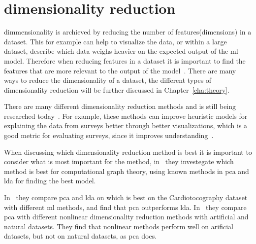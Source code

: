 
\section{dimensionality reduction}\label{sec:dimensionality-reduction}

dimmensionality is archieved by reducing the number of features(dimensions) in a dataset. This for example can help to visualize the data, or within a large dataset, describe which data weighs heavier on the expected output of the \gls{ml} model. Therefore when reducing features in a dataset it is important to find the features that are more relevant to the output of the model~\cite{Feature-engineering-zheng}. There are many ways to reduce the dimensionality of a dataset, the different types of dimensionality reduction will be further discussed in Chapter~\ref{cha:theory}.

There are many different dimensionality reduction methods and is still being researched today~\cite{dimensionality-reduction-cheng}. For example, these methods can improve heuristic models for explaining the data from surveys better through better visualizations, which is a good metric for evaluating surveys, since it improves understanding~\cite{dimensionality-reduction-cheng}.

When discussing which dimensionality reduction method is best it is important to consider what is most important for the method, in~\cite{dimensionality-reduction-maitra} they investegate which method is best for computational graph theory, using known methods in \gls{pca} and \gls{lda} for finding the best model.

In~\cite{dimensionality-reduction-reddy} they compare \gls{pca} and \gls{lda} on which is best on the Cardiotocography dataset with different \gls{ml} methods, and find that \gls{pca} outperforms \gls{lda}. In~\cite{dimensionality-reduction-comparative-review} they compare \gls{pca} with different nonlinear dimensionality reduction methods with artificial and natural datasets. They find that nonlinear methods perform well on arificial datasets, but not on natural datasets, as \gls{pca} does.

